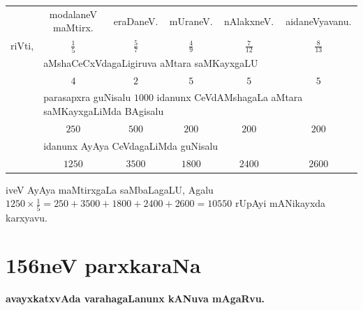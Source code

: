 \begin{center}
\begin{tabular}{lccccc}
 & modalaneV maMtirx. & eraDaneV. & mUraneV. & nAlakxneV. &
 aidaneVyavanu.\\[2pt]
riVti, & $\frac{1}{5}$ & $\frac{5}{7}$ & $\frac{4}{9}$ &
 $\frac{7}{12}$ & $\frac{8}{13}$\\[4pt]
 & \multicolumn{5}{l}{aMshaCeCxVdagaLigiruva aMtara
 saMKayxgaLU}\\[2pt]
& $4$ & $2$ & $5$ & $5$ & $5$\\[4pt]
 & \multicolumn{5}{l}{parasapxra guNisalu $1000$ idanunx CeVdAMshagaLa
 aMtara saMKayxgaLiMda BAgisalu}\\[2pt]
& $250$ & $500$ & $200$ & $200$ & $200$\\[5pt]
 & \multicolumn{5}{l}{idanunx AyAya CeVdagaLiMda guNisalu}\\[2pt]
 & $1250$ & $3500$ & $1800$ & $2400$ & $2600$
\end{tabular}
\end{center}

iveV AyAya maMtirxgaLa saMbaLagaLU, Agalu
$1250\times \frac{1}{5}=250+3500+1800+2400+2600=10550$ rUpAyi
mANikayxda karxyavu. 


\chapter{156neV parxkaraNa}

\begin{center}
{\large\bf avayxkatxvAda varahagaLanunx kANuva mAgaRvu.}
\end{center}

